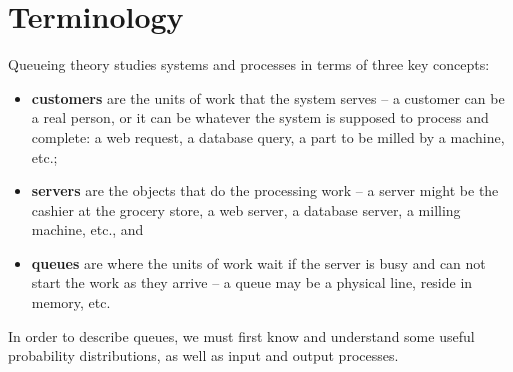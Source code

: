 \section{Terminology}
Queueing theory studies systems and processes in terms of three key concepts:
\begin{itemize}
\item \textbf{customers} are the units of work that the system serves -- a customer can be a real person, or it can be whatever the system is supposed to process and complete: a web request, a database query, a part to be milled by a machine, etc.;
\item \textbf{servers} are the objects that do the processing work -- a server might be the cashier at the grocery store, a web server, a database server, a milling machine, etc., and 
\item \textbf{queues} are where the units of work wait if the server is busy and can not start the work as they arrive -- a queue may be a physical line, reside in memory, etc. 
\end{itemize}
In order to describe queues, we must first know and understand some useful probability distributions, as well as input and output processes.

